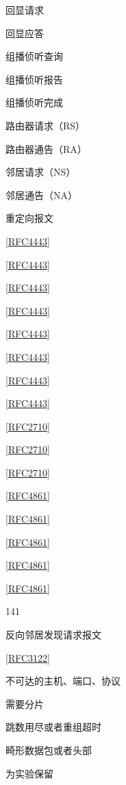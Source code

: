 回显请求

回显应答

组播侦听查询

组播侦听报告

组播侦听完成

路由器请求（RS）

路由器通告（RA）

邻居请求（NS）

邻居通告（NA）

重定向报文

\href{https://www.rfc-editor.org/rfc/rfc4443}{[RFC4443]}

\href{https://www.rfc-editor.org/rfc/rfc4443}{[RFC4443]}

\href{https://www.rfc-editor.org/rfc/rfc4443}{[RFC4443]}

\href{https://www.rfc-editor.org/rfc/rfc4443}{[RFC4443]}

\href{https://www.rfc-editor.org/rfc/rfc4443}{[RFC4443]}

\href{https://www.rfc-editor.org/rfc/rfc4443}{[RFC4443]}

\href{https://www.rfc-editor.org/rfc/rfc4443}{[RFC4443]}

\href{https://www.rfc-editor.org/rfc/rfc4443}{[RFC4443]}

\href{https://www.rfc-editor.org/rfc/rfc2710}{[RFC2710]}

\href{https://www.rfc-editor.org/rfc/rfc2710}{[RFC2710]}

\href{https://www.rfc-editor.org/rfc/rfc2710}{[RFC2710]}

\href{https://www.rfc-editor.org/rfc/rfc4861}{[RFC4861]}

\href{https://www.rfc-editor.org/rfc/rfc4861}{[RFC4861]}

\href{https://www.rfc-editor.org/rfc/rfc4861}{[RFC4861]}

\href{https://www.rfc-editor.org/rfc/rfc4861}{[RFC4861]}

\href{https://www.rfc-editor.org/rfc/rfc4861}{[RFC4861]}

141

反向邻居发现请求报文

\href{https://www.rfc-editor.org/rfc/rfc3122}{[RFC3122]}

不可达的主机、端口、协议

需要分片

跳数用尽或者重组超时

畸形数据包或者头部

为实验保留

